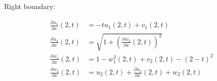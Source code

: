 \documentclass{article}
\providecommand*{\pder}[3][]{ \frac{\partial^{#1}#2}{\partial #3^{#1}} }
\begin{document}
Right boundary:

\begin{align*}
  \pder{u_1}{x}(2,t) & = -t u_1(2,t) + v_1(2,t) \\
  \pder{u_2}{x}(2,t) & = \sqrt{1+\left(\pder{w_2}{x}(2,t)\right)^2} \\
  \pder{w_1}{x}(2,t) & = 1 - w_1^2(2,t) + v_2(2,t) - \left(2-t\right)^2 \\
  \pder{w_2}{x}(2,t) & = u_2(2,t) + \pder{u_2}{x}(2,t) + w_2(2,t)
\end{align*}
\end{document}
